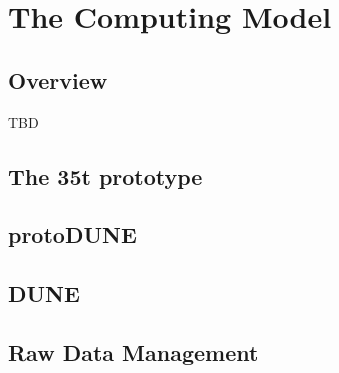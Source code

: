 \section{The Computing Model}
\label{sec:computing_model}
\subsection{Overview}
TBD
\subsection{The 35t prototype}

\newpage
\subsection{protoDUNE}



\subsection{DUNE}


\subsection{Raw Data Management}
